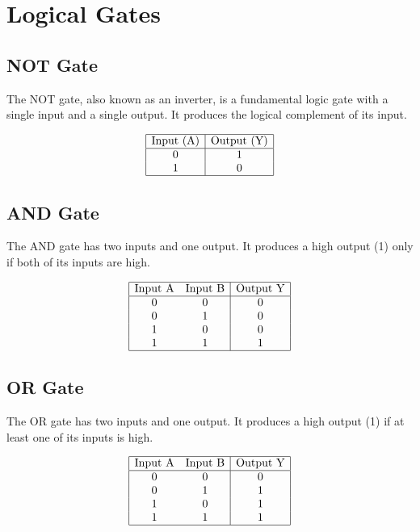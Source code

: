\documentclass{article}
\begin{document}
\section*{Logical Gates}

\subsection*{NOT Gate}

The NOT gate, also known as an inverter, is a fundamental logic gate with a single input and a single output. It produces the logical complement of its input.

\[
\begin{array}{|c|c|}
\hline
\text{Input (A)} & \text{Output (Y)} \\
\hline
0 & 1 \\
1 & 0 \\
\hline
\end{array}
\]

\subsection*{AND Gate}

The AND gate has two inputs and one output. It produces a high output (1) only if both of its inputs are high.

\[
\begin{array}{|cc|c|}
\hline
\text{Input A} & \text{Input B} & \text{Output Y} \\
\hline
0 & 0 & 0 \\
0 & 1 & 0 \\
1 & 0 & 0 \\
1 & 1 & 1 \\
\hline
\end{array}
\]

\subsection*{OR Gate}

The OR gate has two inputs and one output. It produces a high output (1) if at least one of its inputs is high.

\[
\begin{array}{|cc|c|}
\hline
\text{Input A} & \text{Input B} & \text{Output Y} \\
\hline
0 & 0 & 0 \\
0 & 1 & 1 \\
1 & 0 & 1 \\
1 & 1 & 1 \\
\hline
\end{array}
\]
\end{document}
